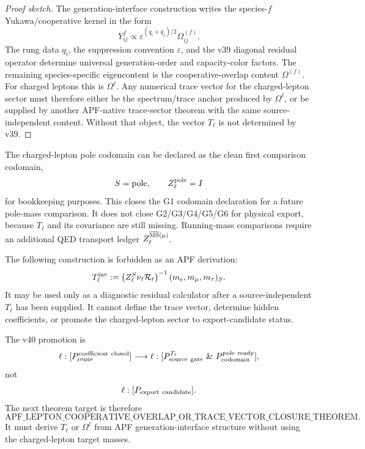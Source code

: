 \begin{proof}[Proof sketch]
The generation-interface construction writes the species-\(f\) Yukawa/cooperative kernel
in the form
\[
    Y_{ij}^{f}\propto \varepsilon^{(q_i+q_j)/2}\Omega_{ij}^{(f)}.
\]
The rung data \(q_i\), the suppression convention \(\varepsilon\), and the v39 diagonal
residual operator determine universal generation-order and capacity-color factors.  The
remaining species-specific eigencontent is the cooperative-overlap content
\(\Omega^{(f)}\).  For charged leptons this is \(\Omega^\ell\).  Any numerical trace vector
for the charged-lepton sector must therefore either be the spectrum/trace anchor produced
by \(\Omega^\ell\), or be supplied by another APF-native trace-sector theorem with the same
source-independent content.  Without that object, the vector \(T_\ell\) is not determined
by v39.
\end{proof}

\begin{corollary}\label{cor:qed-codomain-partial-v40}
The charged-lepton pole codomain can be declared as the clean first comparison codomain,
\[
   S=\text{pole},\qquad Z_\ell^{\rm pole}=I
\]
for bookkeeping purposes.  This closes the G1 codomain declaration for a future pole-mass
comparison.  It does not close G2/G3/G4/G5/G6 for physical export, because \(T_\ell\) and
its covariance are still missing.  Running-mass comparisons require an additional QED
transport ledger \(Z_\ell^{\overline{\rm MS}(\mu)}\).
\end{corollary}

\begin{gate}\label{gate:no-inverse-lepton-trace-vector-v40}
The following construction is forbidden as an APF derivation:
\[
   T_\ell^{\rm inv}
   :=
   \left(Z_\ell^S\nu_\ell\mathcal R_\ell\right)^{-1}
   (m_e,m_\mu,m_\tau)_S.
\]
It may be used only as a diagnostic residual calculator after a source-independent
\(T_\ell\) has been supplied.  It cannot define the trace vector, determine hidden
coefficients, or promote the charged-lepton sector to export-candidate status.
\end{gate}

\begin{statusbox}
The v40 promotion is
\[
  \ell:[P_{\rm route}^{\rm coefficient\ closed}]
  \longrightarrow
  \ell:[P_{\rm source\ gate}^{T_\ell}\ \&\ P_{\rm codomain}^{\rm pole\ ready}],
\]
not
\[
  \ell:[P_{\rm export\ candidate}].
\]
The next theorem target is therefore
\[
  \boxed{\text{APF\_LEPTON\_COOPERATIVE\_OVERLAP\_OR\_TRACE\_VECTOR\_CLOSURE\_THEOREM}.}
\]
It must derive \(T_\ell\) or \(\Omega^\ell\) from APF generation-interface structure without
using the charged-lepton target masses.
\end{statusbox}
